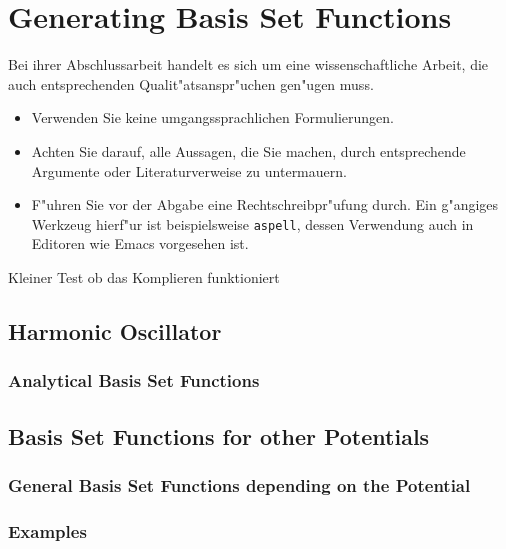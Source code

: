 \chapter{Generating Basis Set Functions}
\label{c:inhalt}



Bei ihrer Abschlussarbeit handelt es sich um eine
  wissenschaftliche Arbeit, die auch entsprechenden
  Qualit"atsanspr"uchen gen"ugen muss.
  \begin{itemize}
  \item Verwenden Sie keine umgangssprachlichen Formulierungen.
  \item Achten Sie darauf, alle Aussagen, die Sie machen, durch
    entsprechende Argumente oder Literaturverweise zu untermauern.
  \item F"uhren Sie vor der Abgabe eine Rechtschreibpr"ufung durch.
    Ein g"angiges Werkzeug hierf"ur ist beispielsweise
    \texttt{aspell}, dessen Verwendung auch in Editoren wie Emacs
    vorgesehen ist.
  \end{itemize}


Kleiner Test ob das Komplieren funktioniert

\section{Harmonic Oscillator}
\subsection{Analytical Basis Set Functions}
\section{Basis Set Functions for other Potentials}
\subsection{General Basis Set Functions depending on the Potential}
\subsection{Examples}